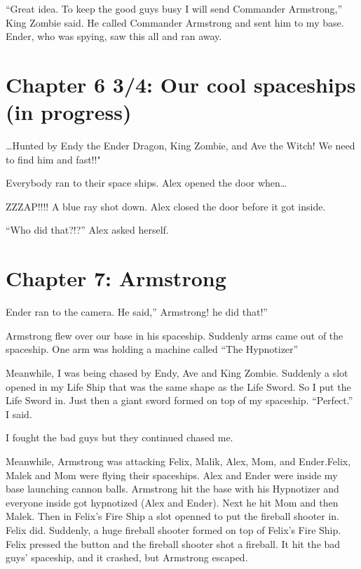 \documentclass[12pt,oneside]{krantz}
\begin{document}
``Great idea. To keep the good guys busy I will send Commander
Armstrong,'' King Zombie said. He called Commander Armstrong and sent
him to my base. Ender, who was spying, saw this all and ran away.

\hypertarget{chapter-6-34-our-cool-spaceships-in-progress}{%
\chapter*{Chapter 6 3/4: Our cool spaceships (in
progress)}\label{chapter-6-34-our-cool-spaceships-in-progress}}

\ldots{}Hunted by Endy the Ender Dragon, King Zombie, and Ave the Witch!
We need to find him and fast!!"

Everybody ran to their space ships. Alex opened the door when\ldots{}

ZZZAP!!!! A blue ray shot down. Alex closed the door before it got
inside.

``Who did that?!?'' Alex asked herself.

\hypertarget{chapter-7-armstrong}{%
\chapter*{Chapter 7: Armstrong}\label{chapter-7-armstrong}}


Ender ran to the camera. He said,'' Armstrong! he did that!''

Armstrong flew over our base in his spaceship. Suddenly arms came out of
the spaceship. One arm was holding a machine called ``The Hypnotizer''

Meanwhile, I was being chased by Endy, Ave and King Zombie. Suddenly a
slot opened in my Life Ship that was the same shape as the Life Sword.
So I put the Life Sword in. Just then a giant sword formed on top of my
spaceship. ``Perfect.'' I said.

I fought the bad guys but they continued chased me.

Meanwhile, Armstrong was attacking Felix, Malik, Alex, Mom, and
Ender.Felix, Malek and Mom were flying their spaceships. Alex and Ender
were inside my base launching cannon balls. Armstrong hit the base with
his Hypnotizer and everyone inside got hypnotized (Alex and Ender). Next
he hit Mom and then Malek. Then in Felix's Fire Ship a slot openned to
put the fireball shooter in. Felix did. Suddenly, a huge fireball
shooter formed on top of Felix's Fire Ship. Felix pressed the button and
the fireball shooter shot a fireball. It hit the bad guys' spaceship,
and it crashed, but Armstrong escaped.
\end{document}
